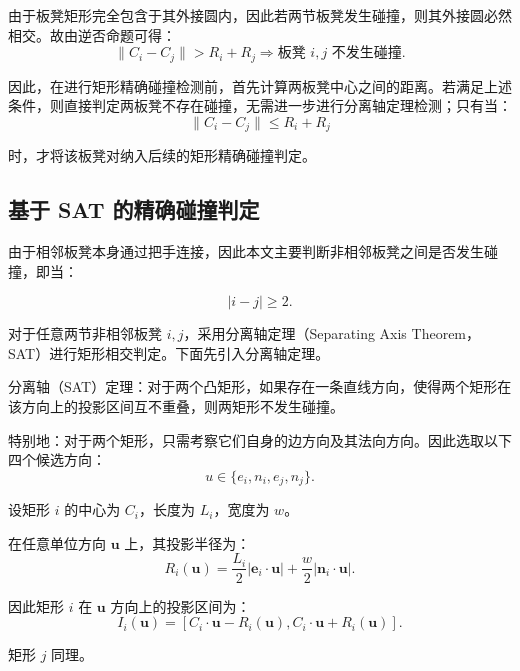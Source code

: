 由于板凳矩形完全包含于其外接圆内，因此若两节板凳发生碰撞，则其外接圆必然相交。故由逆否命题可得：
\begin{equation*}
\|C_i - C_j\| > R_i + R_j \Rightarrow \text{板凳 } i, j \text{ 不发生碰撞.}
\end{equation*}

因此，在进行矩形精确碰撞检测前，首先计算两板凳中心之间的距离。若满足上述条件，则直接判定两板凳不存在碰撞，无需进一步进行分离轴定理检测；只有当：
\begin{equation*}
\|C_i - C_j\| \leq R_i + R_j
\end{equation*}

时，才将该板凳对纳入后续的矩形精确碰撞判定。

\subsection{基于 SAT 的精确碰撞判定}

由于相邻板凳本身通过把手连接，因此本文主要判断非相邻板凳之间是否发生碰撞，即当：

\begin{equation*}
|i-j| \ge 2.
\end{equation*}

对于任意两节非相邻板凳 $i,j$，采用分离轴定理（Separating Axis Theorem，SAT）进行矩形相交判定。下面先引入分离轴定理。

分离轴（SAT）定理：对于两个凸矩形，如果存在一条直线方向，使得两个矩形在该方向上的投影区间互不重叠，则两矩形不发生碰撞。

特别地：对于两个矩形，只需考察它们自身的边方向及其法向方向。因此选取以下四个候选方向：
\begin{equation*}
u \in \{ e_i, n_i, e_j, n_j \}.
\end{equation*}


设矩形 \(i\) 的中心为 \(C_i\)，长度为 \(L_i\)，宽度为 \(w\)。

在任意单位方向 \(\mathbf{u}\) 上，其投影半径为：
\begin{equation*}
R_i(\mathbf{u}) = \frac{L_i}{2}|\mathbf{e}_i \cdot \mathbf{u}| + \frac{w}{2}|\mathbf{n}_i \cdot \mathbf{u}|.
\end{equation*}

因此矩形 \(i\) 在 \(\mathbf{u}\) 方向上的投影区间为：
\begin{equation*}
I_i(\mathbf{u}) = [C_i \cdot \mathbf{u} - R_i(\mathbf{u}), C_i \cdot \mathbf{u} + R_i(\mathbf{u})].
\end{equation*}

矩形 \(j\) 同理。

